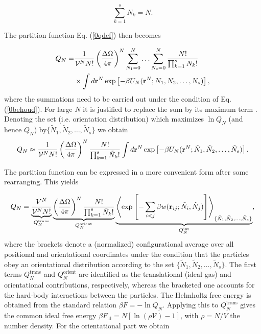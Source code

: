 \begin{equation}
\sum _{k=1}^{s} N_{k} =N. \label{0behoud}
\end{equation}

The partition function Eq. (\ref{0qdef}) then becomes

\begin{align}
Q_{N}=&\frac{1}{\mathcal{V} ^{N} N!}\left(\frac{\Delta \Omega}{4\pi}\right)^{N}
\sum_{N_{1}=0}^{N}\ldots \sum_{N_{s}=0}^{N}\frac{N!}{\prod_{k=1}^{s}N_{k}!} \nonumber \\
&\times\int d{\bf r}^{N}
\exp\left[-\beta U_{N}({\bf r}^{N}; N_{1},N_{2},\ldots,N_{s})\right], \label{0Qalgemeen}
\end{align}
where the summations need to be carried out under the condition of Eq. (\ref{0behoud}). For large $N$ it is justified to replace the sum  by its maximum term \cite{Hill}. Denoting the set (i.e. orientation distribution) which maximizes $\ln Q_{N}$ (and hence $Q_{N}$) by$\{\tilde{N}_{1},\tilde{N}_{2},\ldots,\tilde{N}_{s}\}$ we obtain
\begin{equation}
Q_{N}\approx \frac{1}{\mathcal{V} ^{N} N!}\left(\frac{\Delta \Omega}{4\pi}\right)^{N}
\frac{N!}{\prod_{k=1}^{s}\tilde{N}_{k}!}\int d{\bf r}^{N}
\exp\left[-\beta U_{N}({\bf r}^{N}; \tilde{N}_{1},\tilde{N}_{2},\ldots,\tilde{N}_{s})\right].
\end{equation}

The partition function can be expressed in a more convenient form after some rearranging. This yields

\begin{equation}
Q_{N}= \underbrace{\frac{V^{N}}{\mathcal{V} ^{N} N!}}_{Q_{N}^{\text{trans}}}
\underbrace{\left(\frac{\Delta \Omega}{4\pi}\right)^{N}
\frac{N!}{\prod_{k=1}^{s}\tilde{N}_{k}!}}_{Q_{N}^{\text{orient}}}
\underbrace{\left < \exp\left[-\sum_{i<j}\beta w({\bf r}_{ij};
\tilde{N}_{i},\tilde{N}_{j})\right] \right >_{\{\tilde{N}_{1},\tilde{N}_{2},\ldots,\tilde{N}_{s}\}}
}_{Q_{N}^{\text{int}}},
\end{equation}
where the brackets denote a (normalized) configurational average over all positional and orientational coordinates under the condition that the particles obey an orientational distribution according to the set $\{\tilde{N}_{1},\tilde{N}_{2},\ldots,\tilde{N}_{s}\}$. The first terms $Q_{N}^{\text{trans}}$ and $Q_{N}^{\text{orient}}$ are  identified as the translational (ideal gas) and orientational contributions, respectively, whereas the bracketed one accounts for the hard-body interactions between the particles. The Helmholtz free energy is obtained from the standard relation $\beta F= -\ln Q_{N}$. Applying this to $Q_{N}^{\text{trans}}$ gives the common ideal free energy $\beta F_{\text{id}}= N\left[\ln (\rho \mathcal{V})-1\right]$, with $\rho=N/V$ the number density.
For the orientational part we obtain

